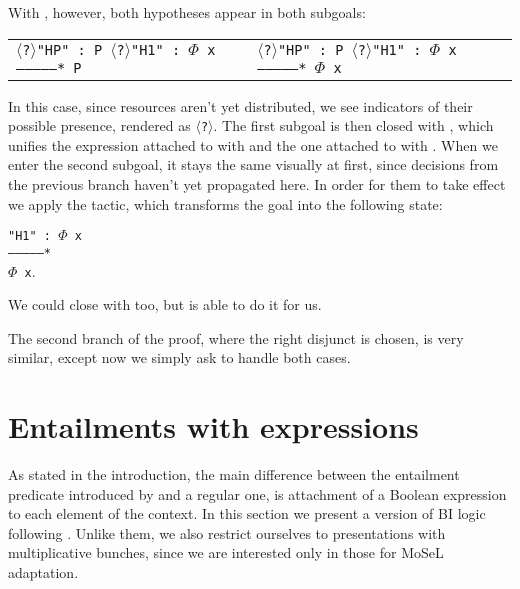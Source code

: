 With , however, both hypotheses appear in both subgoals:

\begin{minipage}[t]{\linewidth}
\begin{tabular}{l l}
  \parbox[t]{0.5\textwidth}{\texttt{$\langle$?$\rangle$"HP" : P\\
  $\langle$?$\rangle$"H1" : $\Phi$ x\\
  ---------------*\\
  P}} &
  \parbox[t]{0.5\textwidth}{\texttt{$\langle$?$\rangle$"HP" : P\\
  $\langle$?$\rangle$"H1" : $\Phi$ x\\
  ---------------*\\
  $\Phi$ x }}
\end{tabular}
\end{minipage}

In this case, since resources aren't yet distributed, we see indicators of their possible presence, rendered as \texttt{$\langle$?$\rangle$}.
The first subgoal is then closed with , which unifies the expression attached to  with \true and the one attached to  with \false.
When we enter the second subgoal, it stays the same visually at first, since decisions from the previous branch haven't yet propagated here.
In order for them to take effect we apply the  tactic, which transforms the goal into the following state:

\begin{minipage}[t]{\linewidth}
\texttt{"H1" : $\Phi$ x\\
---------------*\\
$\Phi$ x}.
\end{minipage}

We could close with  too, but  is able to do it for us.

The second branch of the proof, where the right disjunct is chosen, is very similar, except now we simply ask  to handle both cases.

\section{Entailments with expressions}

As stated in the introduction, the main difference between the entailment predicate introduced by \citet{harlandResourceDistributionBooleanConstraints2003} and a regular one, is attachment of a Boolean expression to each element of the context.
In this section we present a version of BI logic following \citet{harlandResourceDistributionBooleanConstraints2003}.
Unlike them, we also restrict ourselves to presentations with multiplicative bunches, since we are interested only in those for MoSeL adaptation.

